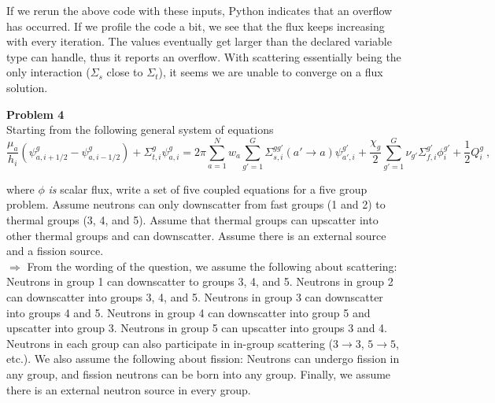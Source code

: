 \documentclass[10pt]{article}
\begin{document}
If we rerun the above code with these inputs, Python indicates that an overflow has occurred. If we profile the code a bit, we see that the flux keeps increasing with every iteration. The values eventually get larger than the declared variable type can handle, thus it reports an overflow. With scattering essentially being the only interaction ($\Sigma_s$ close to $\Sigma_t$), it seems we are unable to converge on a flux solution.





\newpage
\noindent \textbf{Problem 4}\\
Starting from the following general system of equations
%
\begin{equation*}
\frac{\mu_a}{h_i}(\psi_{a,i+1/2}^g - \psi_{a,i-1/2}^g)+ \Sigma_{t,i}^g\psi_{a,i}^g = 2\pi\sum_{a=1}^N w_a \sum_{g'=1}^G \Sigma_{s, i}^{gg'}(a'\rightarrow a)\psi_{a',i}^{g'} + \frac{\chi_g}{2}\sum_{g'=1}^G \nu_{g'}\Sigma_{f,i}^{g'} \phi_{i}^{g'} + \frac{1}{2}Q_i^g\:,
\end{equation*}

where  $\phi$ \textit{is} scalar flux, write a set of five coupled equations for a five group problem. Assume neutrons can only downscatter from fast groups (1 and 2) to thermal groups (3, 4, and 5). Assume that thermal groups can upscatter into other thermal groups and can downscatter. Assume there is an external source and a fission source.\\

$\Rightarrow$ From the wording of the question, we assume the following about scattering: Neutrons in group 1 can downscatter to groups 3, 4, and 5. Neutrons in group 2 can downscatter into groups 3, 4, and 5. Neutrons in group 3 can downscatter into groups 4 and 5. Neutrons in group 4 can downscatter into group 5 and upscatter into group 3. Neutrons in group 5 can upscatter into groups 3 and 4. Neutrons in each group can also participate in in-group scattering ($3\rightarrow3$, $5\rightarrow5$, etc.). We also assume the following about fission: Neutrons can undergo fission in any group, and fission neutrons can be born into any group. Finally, we assume there is an external neutron source in every group. \\

\end{document}
